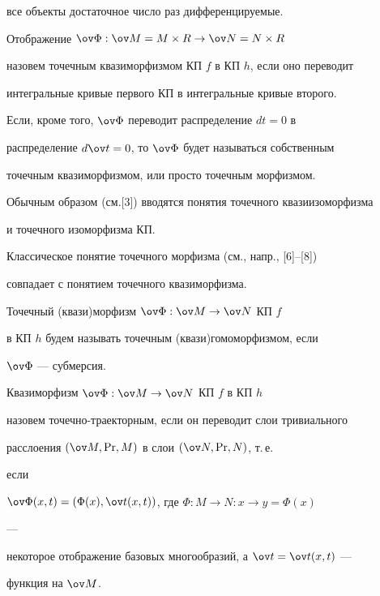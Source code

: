 все объекты достаточное число раз дифференцируемые. 


 


\begin{defn} 


Отображение $\ov\Phi:\ov M=M\times R\to\ov N=N\times R$ 


назовем точечным квазиморфизмом КП $f$ в КП $h$, если оно переводит 


интегральные кривые первого КП в интегральные кривые второго. 


Если, кроме того, $\ov\Phi$ переводит распределение $dt=0$ в 


распределение $d\ov t=0$, то $\ov\Phi$ будет называться собственным 


точечным квазиморфизмом, или просто точечным морфизмом. 


\end{defn} 


 


Обычным образом (см.[3]) вводятся понятия точечного квазиизоморфизма 


и точечного изоморфизма КП. 


Классическое понятие точечного морфизма (см., напр., [6]--[8]) 


совпадает с понятием точечного квазиморфизма.


 


\begin{defn} 


Точечный (квази)морфизм $\ov\Phi:\ov M\to\ov N$ КП $f$ 


в КП $h$ будем называть точечным (квази)гомоморфизмом, если 


$\ov\Phi$ --- субмерсия. 


\end{defn} 


 


\begin{defn} 


Квазиморфизм $\ov\Phi:\ov M\to\ov N$ КП $f$ в КП $h$ 


назовем точечно-траекторным, если он переводит слои тривиального


расслоения $(\ov M,\Pr,M)$ в слои $(\ov N,\Pr,N)$, т.\,е. 


если 


$\ov\Phi(x,t)=(\Phi(x),\ov t(x,t))$, где $\Phi:M\to N:x\to y=\Phi(x)$ 


--- 


некоторое отображение базовых многообразий, а $\ov t=\ov t(x,t)$ --- 


функция на $\ov M$. 


\end{defn} 



